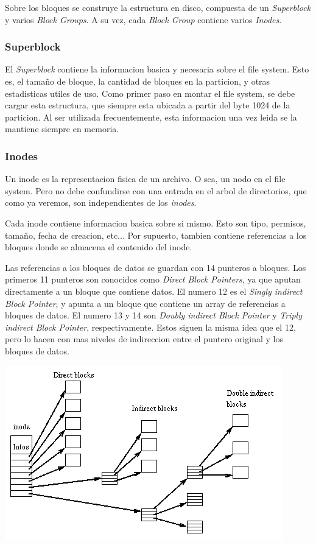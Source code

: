 \documentclass[a4paper,10pt]{article}
\begin{document}
Sobre los bloques se construye la estructura en disco, compuesta de un \textit{Superblock} y varios \textit{Block Groups}.
A su vez, cada \textit{Block Group} contiene varios \textit{Inodes}.

\subsubsection{Superblock}
El \textit{Superblock} contiene la informacion basica y necesaria sobre el file system.
Esto es, el tamaño de bloque, la cantidad de bloques en la particion, y otras estadisticas utiles de uso.
Como primer paso en montar el file system, se debe cargar esta estructura, que siempre esta ubicada a partir del byte 1024 de la particion.
Al ser utilizada frecuentemente, esta informacion una vez leida se la mantiene siempre en memoria.

\subsubsection{Inodes}
Un inode es la representacion fisica de un archivo.
O sea, un nodo en el file system.
Pero no debe confundirse con una entrada en el arbol de directorios, que como ya veremos, son independientes de los \textit{inodes}.

Cada inode contiene informacion basica sobre si mismo.
Esto son tipo, permisos, tamaño, fecha de creacion, etc...
Por supuesto, tambien contiene referencias a los bloques donde se almacena el contenido del inode.

Las referencias a los bloques de datos se guardan con 14 punteros a bloques.
Los primeros 11 punteros son conocidos como \textit{Direct Block Pointers}, ya que aputan directamente a un bloque que contiene datos.
El numero 12 es el \textit{Singly indirect Block Pointer}, y apunta a un bloque que contiene un array de referencias a bloques de datos.
El numero 13 y 14 son \textit{Doubly indirect Block Pointer} y \textit{Triply indirect Block Pointer}, respectivamente.
Estos siguen la misma idea que el 12, pero lo hacen con mas niveles de indireccion entre el puntero original y los bloques de datos.

\begin{center}
 \includegraphics{./images/Ext2-inode.png}
\end{center}
\end{document}
